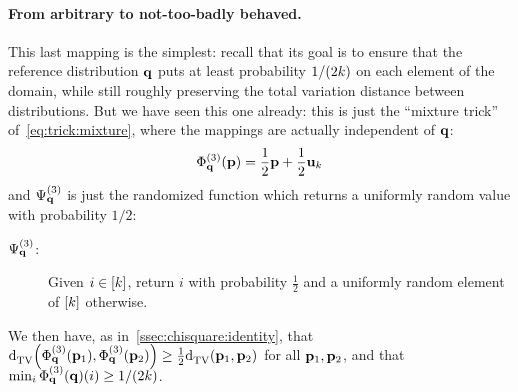 \paragraph{From arbitrary to not-too-badly behaved.} This last mapping is the simplest: recall that its goal is to ensure that the reference distribution $\mathbf{q}$ puts at least probability $1/(2k)$ on each element of the domain, while still roughly preserving the total variation distance between distributions. But we have seen this one already: this is just the ``mixture trick'' of~\cref{eq:trick:mixture}, where the mappings are actually independent of $\mathbf{q}$:
\[
	\Phi^{(3)}_{\mathbf{q}}(\mathbf{p}) = \frac{1}{2}\mathbf{p}+\frac{1}{2}\mathbf{u}_k
\]
and $\Psi^{(3)}_{\mathbf{q}}$ is just the randomized function which returns a uniformly random value with probability $1/2$:
\begin{description}
	\item[$\Psi^{(3)}_{\mathbf{q}}$:] Given $i \in [k]$, return $i$ with probability $\frac{1}{2}$ and a uniformly random element of $[k]$ otherwise.
\end{description}
We then have, as in~\cref{ssec:chisquare:identity}, that $\smash{\totalvardist{\Phi^{(3)}_\q(\p_1)}{\Phi^{(3)}_\q(\p_2)}}\geq \frac{1}{2}\totalvardist{\p_1}{\p_2}$ for all $\mathbf{p}_1,\mathbf{p}_2$, and that $\min_i \smash{\Phi^{(3)}_{\mathbf{q}}(\mathbf{q})(i)} \geq 1/(2k)$.

